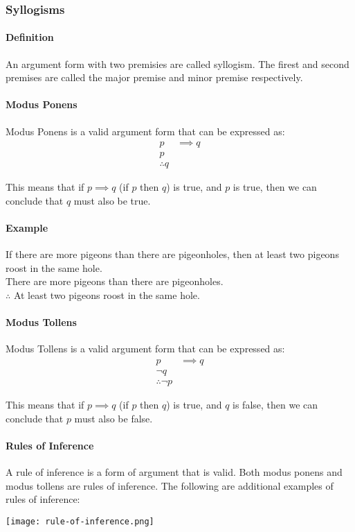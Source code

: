 \pagebreak

\subsubsection*{Syllogisms}
\paragraph*{Definition}
An argument form with two premisies are called syllogism. The firest and second premises are called the 
major premise and minor premise respectively.

\paragraph*{Modus Ponens}
Modus Ponens is a valid argument form that can be expressed as:
\begin{align*}
    p &\implies q\\
    p &\\
    \therefore q &
\end{align*}

This means that if $p \implies q$ (if $p$ then $q$) is true, and $p$ is true, then we can conclude that $q$ must also be true.
\paragraph*{Example}
If there are more pigeons than there are pigeonholes, then at least two pigeons roost in the same hole.\\
There are more pigeons than there are pigeonholes.\\
$\therefore$ At least two pigeons roost in the same hole.

\paragraph*{Modus Tollens}
Modus Tollens is a valid argument form that can be expressed as:
\begin{align*}
    p &\implies q\\
    \neg q &\\
    \therefore \neg p &
\end{align*}

This means that if $p \implies q$ (if $p$ then $q$) is true, and $q$ is false, then we can conclude that $p$ must also be false.

\pagebreak

\paragraph*{Rules of Inference}
A rule of inference is a form of argument that is valid. Both modus ponens and modus tollens are rules of inference. The following 
are additional examples of rules of inference:
\begin{center}
    \texttt{[image: rule-of-inference.png]}
\end{center}


